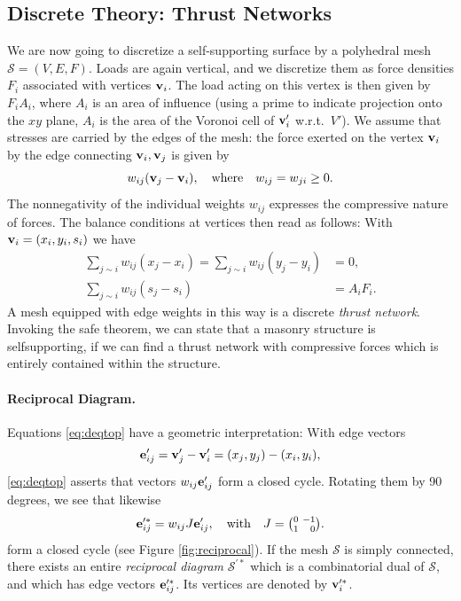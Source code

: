 \documentclass[annual]{acmsiggraph}
\def\SS{{\mathcal S}}
\begin{document}
\subsection{Discrete Theory: Thrust Networks}

We are now going to discretize a self-supporting surface by a polyhedral 
mesh $\SS=(V,E,F)$. Loads are again vertical, and we discretize them as
force densities $F_i$ associated with vertices ${\mathbf v}_i$. The load acting on 
this vertex is then given by $F_iA_i$, where $A_i$ is an area of influence 
(using a prime to indicate projection onto the $xy$ plane, $A_i$ is the 
area of the Voronoi cell of ${\mathbf v}_i'$ w.r.t.\ $V'$). We assume that 
stresses are carried by the edges of the mesh: the force exerted on the 
vertex ${\mathbf v}_i$ by the edge connecting ${\mathbf v}_i,{\mathbf v}_j$ is given by
	$$
	w_{ij} ({\mathbf v}_j-{\mathbf v}_i),
	\quad
	\text{where}\quad
	w_{ij}=w_{ji}\ge 0.
	$$
 The nonnegativity of the individual weights $w_{ij}$ expresses the 
compressive nature of forces. The balance conditions at vertices then read 
as follows: With ${\mathbf v}_i=(x_i,y_i,s_i)$ we have
	\begin{align}
	\sum_{j\sim i}
		w_{ij} (x_j - x_i) 
	=
	\sum_{j\sim i}
		w_{ij} (y_j - y_i) &= 0,
			 \label{eq:deqtop} \\
	\sum_{j\sim i}
		w_{ij} (s_j - s_i) 
		&= A_i F_i.
			\label{eq:deqz}
	\end{align}
 A mesh equipped with edge weights in this way is a discrete \emph{thrust 
network}. Invoking the safe theorem, we can state that a masonry structure 
is self\dash supporting, if we can find a thrust network with compressive 
forces which is entirely contained within the structure.


\paragraph{Reciprocal Diagram.}

Equations \eqref{eq:deqtop} have a geometric interpretation: With edge 
vectors
	$${\mathbf e}'_{ij} = {\mathbf v}_j'-{\mathbf v}_i'=(x_j, y_j) - (x_i, y_i),
	$$
 \eqref{eq:deqtop} asserts that vectors $w_{ij} {\mathbf e}_{ij}'$ form a closed 
cycle. Rotating them by 90 degrees, we see that likewise
	$$
	{\mathbf e}_{ij}^{\prime *} = w_{ij} J {\mathbf e}_{ij}', \quad \text{with}\quad
	J={\textstyle{0 \ -1 \choose 1 \ \hphantom{-}0}}.
	$$
 form a closed cycle (see Figure \ref{fig:reciprocal}).
If the mesh $\SS$ is simply connected, there exists 
an entire {\em reciprocal diagram} $\SS^{\prime *}$ which is a 
combinatorial dual of $\SS$, and which has edge vectors ${\mathbf e}_{ij}'^*$.
 Its vertices are denoted by ${\mathbf v}_i^{\prime *}$.
\end{document}
